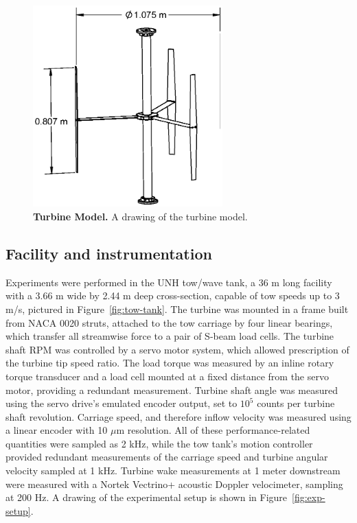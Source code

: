 \documentclass[10pt,letterpaper]{article}
\begin{document}
\begin{figure}[h]
\includegraphics[width=0.65\textwidth]{figures/turbine}
\caption{{\bf Turbine Model.}
A drawing of the turbine model.}
\label{fig:turbine-drawing}
\end{figure}


\subsection*{Facility and instrumentation}

Experiments were performed in the UNH tow/wave tank, a 36 m long facility with a
3.66 m wide by 2.44 m deep cross-section, capable of tow speeds up to 3 m/s,
pictured in Figure~\ref{fig:tow-tank}. The turbine was mounted in a frame built
from NACA 0020 struts, attached to the tow carriage by four linear bearings,
which transfer all streamwise force to a pair of S-beam load cells. The turbine
shaft RPM was controlled by a servo motor system, which allowed prescription of
the turbine tip speed ratio. The load torque was measured by an inline rotary
torque transducer and a load cell mounted at a fixed distance from the servo
motor, providing a redundant measurement. Turbine shaft angle was measured using
the servo drive's emulated encoder output, set to $10^5$ counts per turbine
shaft revolution. Carriage speed, and therefore inflow velocity was measured
using a linear encoder with 10 $\mu$m resolution. All of these
performance-related quantities were sampled as 2 kHz, while the tow tank's
motion controller provided redundant measurements of the carriage speed and
turbine angular velocity sampled at 1 kHz. Turbine wake measurements at 1 meter
downstream were measured with a Nortek Vectrino+ acoustic Doppler velocimeter,
sampling at 200 Hz. A drawing of the experimental setup is shown in
Figure~\ref{fig:exp-setup}.
\end{document}
